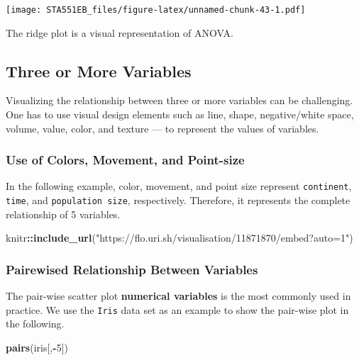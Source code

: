 \documentclass[
]{book}
\newenvironment{Shaded}{\begin{snugshade}}{\end{snugshade}}
\newcommand{\DecValTok}[1]{\textcolor[rgb]{0.00,0.00,0.81}{#1}}
\newcommand{\FunctionTok}[1]{\textcolor[rgb]{0.13,0.29,0.53}{\textbf{#1}}}
\newcommand{\NormalTok}[1]{#1}
\newcommand{\SpecialCharTok}[1]{\textcolor[rgb]{0.81,0.36,0.00}{\textbf{#1}}}
\newcommand{\StringTok}[1]{\textcolor[rgb]{0.31,0.60,0.02}{#1}}
\begin{document}
\texttt{[image: STA551EB\_files/figure-latex/unnamed-chunk-43-1.pdf]}

The ridge plot is a visual representation of ANOVA.

\hfill\break

\hypertarget{three-or-more-variables}{%
\subsection{Three or More Variables}\label{three-or-more-variables}}

Visualizing the relationship between three or more variables can be challenging. One has to use visual design elements such as line, shape, negative/white space, volume, value, color, and texture --- to represent the values of variables.

\hfill\break

\hypertarget{use-of-colors-movement-and-point-size}{%
\subsubsection{Use of Colors, Movement, and Point-size}\label{use-of-colors-movement-and-point-size}}

In the following example, color, movement, and point size represent \texttt{continent}, \texttt{time}, and \texttt{population\ size}, respectively. Therefore, it represents the complete relationship of 5 variables.

\begin{Shaded}
\begin{Highlighting}[]
\NormalTok{knitr}\SpecialCharTok{::}\FunctionTok{include\_url}\NormalTok{(}\StringTok{"https://flo.uri.sh/visualisation/11871870/embed?auto=1"}\NormalTok{)}
\end{Highlighting}
\end{Shaded}

\hfill\break

\hypertarget{pairewised-relationship-between-variables}{%
\subsubsection{Pairewised Relationship Between Variables}\label{pairewised-relationship-between-variables}}

The pair-wise scatter plot \textbf{numerical variables} is the most commonly used in practice. We use the \texttt{Iris} data set as an example to show the pair-wise plot in the following.

\begin{Shaded}
\begin{Highlighting}[]
\FunctionTok{pairs}\NormalTok{(iris[,}\SpecialCharTok{{-}}\DecValTok{5}\NormalTok{])}
\end{Highlighting}
\end{Shaded}
\end{document}

